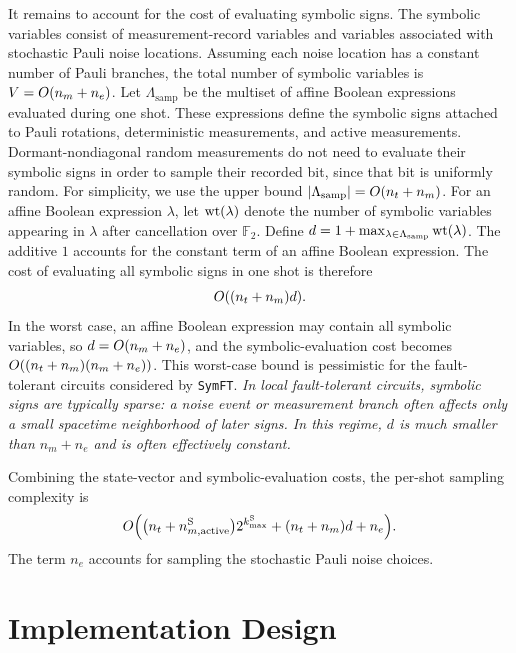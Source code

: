 \documentclass[a4paper,onecolumn,unpublished]{quantumarticle}
\DeclarePairedDelimiter\rbra{\lparen}{\rparen}
\DeclarePairedDelimiter\abs{\lvert}{\rvert}
\DeclareMathOperator{\wt}{wt}
\newcommand{\tFont}[1]{\texttt{#1}}
\newcommand{\symft}{\tFont{SymFT}}
\newcommand{\FF}{\mathbb{F}}
\begin{document}
It remains to account for the cost of evaluating symbolic signs.
The symbolic variables consist of measurement-record variables and variables associated with stochastic Pauli noise locations.
Assuming each noise location has a constant number of Pauli branches, the total number of symbolic variables is $V = O\rbra{n_m+n_e}$.
Let $\Lambda_{\mathrm{samp}}$ be the multiset of affine Boolean expressions evaluated during one shot.
These expressions define the symbolic signs attached to Pauli rotations, deterministic measurements, and active measurements.
Dormant-nondiagonal random measurements do not need to evaluate their symbolic signs in order to sample their recorded bit, since that bit is uniformly random.
For simplicity, we use the upper bound $\abs{\Lambda_{\mathrm{samp}}} = O\rbra{n_t+n_m}$.
For an affine Boolean expression $\lambda$, let $\wt\rbra{\lambda}$ denote the number of symbolic variables appearing in $\lambda$ after cancellation over $\FF_2$.
Define $d = 1 + \max_{\lambda\in\Lambda_{\mathrm{samp}}} \wt\rbra{\lambda}$.
The additive $1$ accounts for the constant term of an affine Boolean expression.
The cost of evaluating all symbolic signs in one shot is therefore
\begin{equation*}
    O\rbra*{\rbra*{n_t+n_m}d}.
\end{equation*}
In the worst case, an affine Boolean expression may contain all symbolic variables, so $d = O\rbra{n_m+n_e}$, and the symbolic-evaluation cost becomes
$O\rbra*{\rbra*{n_t+n_m}\rbra*{n_m+n_e}}$.
This worst-case bound is pessimistic for the fault-tolerant circuits considered by \symft{}.
\emph{In local fault-tolerant circuits, symbolic signs are typically sparse: a noise event or measurement branch often affects only a small spacetime neighborhood of later signs.
In this regime, $d$ is much smaller than $n_m+n_e$ and is often effectively constant.}

Combining the state-vector and symbolic-evaluation costs, the per-shot sampling complexity is
\begin{equation*}
    O\rbra*{\rbra*{n_t+n_{m,\mathrm{active}}^{\mathrm S}}
    2^{k_{\max}^{\mathrm S}} + \rbra*{n_t+n_m}d+n_e}.
\end{equation*}
The term $n_e$ accounts for sampling the stochastic Pauli noise choices.

\section{Implementation Design}
\label{sec:implementation}
\end{document}
